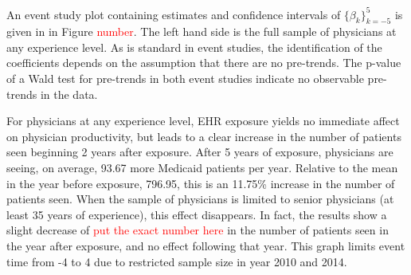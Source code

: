 \documentclass[11pt]{article}
\begin{document}
An event study plot containing estimates and confidence intervals of  $\{\beta_k\}_{k=-5}^5$  is given in in Figure \textcolor{red}{number}. The left hand side is the full sample of physicians at any experience level. As is standard in event studies, the identification of the coefficients depends on the assumption that there are no pre-trends. The p-value of a Wald test for pre-trends in both event studies indicate no observable pre-trends in the data.

For physicians at any experience level, EHR exposure yields no immediate affect on physician productivity, but leads to a clear increase in the number of patients seen beginning 2 years after exposure. After 5 years of exposure, physicians are seeing, on average, 93.67 more Medicaid patients per year. Relative to the mean in the year before exposure, 796.95, this is an 11.75\% increase in the number of patients seen. When the sample of physicians is limited to senior physicians (at least 35 years of experience), this effect disappears. In fact, the results show a slight decrease of \textcolor{red}{put the exact number here} in the number of patients seen in the year after exposure, and no effect following that year. This graph limits event time from -4 to 4 due to restricted sample size in year 2010 and 2014. 
\end{document}
